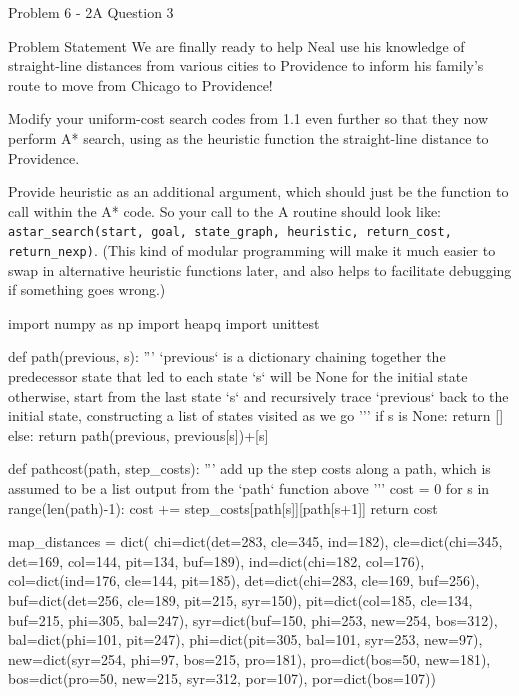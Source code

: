 \begin{problem}{Problem 6 - 2A Question 3}
    \begin{statement}{Problem Statement}
        We are finally ready to help Neal use his knowledge of straight-line distances from various cities to Providence to inform his family's route to move from Chicago to Providence!

        Modify your uniform-cost search codes from 1.1 even further so that they now perform A* search, using as the heuristic function the straight-line distance to Providence.

        Provide heuristic as an additional argument, which should just be the function to call within the A* code. So your call to the A routine should look like: \texttt{astar\_search(start, goal, state\_graph, heuristic, return\_cost, return\_nexp)}. 
        (This kind of modular programming will make it much easier to swap in alternative heuristic functions later, and also helps to facilitate debugging if something goes wrong.)
    \end{statement}

    \begin{highlight}[Solution]
    \begin{code}[Python]
    import numpy as np
    import heapq
    import unittest
    
    def path(previous, s): 
        '''
        `previous` is a dictionary chaining together the predecessor state that led to each state
        `s` will be None for the initial state
        otherwise, start from the last state `s` and recursively trace `previous` back to the initial state,
        constructing a list of states visited as we go
        '''
        if s is None:
            return []
        else:
            return path(previous, previous[s])+[s]
    
    def pathcost(path, step_costs):
        '''
        add up the step costs along a path, which is assumed to be a list output from the `path` function above
        '''
        cost = 0
        for s in range(len(path)-1):
            cost += step_costs[path[s]][path[s+1]]
        return cost
    
    map_distances = dict(
        chi=dict(det=283, cle=345, ind=182),
        cle=dict(chi=345, det=169, col=144, pit=134, buf=189),
        ind=dict(chi=182, col=176),
        col=dict(ind=176, cle=144, pit=185),
        det=dict(chi=283, cle=169, buf=256),
        buf=dict(det=256, cle=189, pit=215, syr=150),
        pit=dict(col=185, cle=134, buf=215, phi=305, bal=247),
        syr=dict(buf=150, phi=253, new=254, bos=312),
        bal=dict(phi=101, pit=247),
        phi=dict(pit=305, bal=101, syr=253, new=97),
        new=dict(syr=254, phi=97, bos=215, pro=181),
        pro=dict(bos=50, new=181),
        bos=dict(pro=50, new=215, syr=312, por=107),
        por=dict(bos=107))
    

\end{code}
\end{highlight}
\end{problem}

